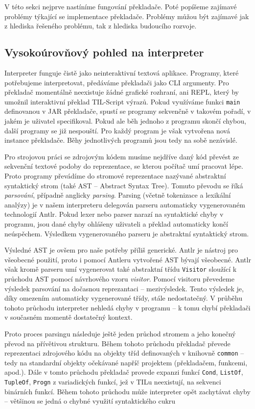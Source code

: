 V této sekci nejprve nastíníme fungování překladače. Poté popíšeme zajímavé problémy týkající se
implementace překladače. Problémy můžou být zajímavé jak z hlediska řešeného problému, tak
z hlediska budoucího rozvoje.

\subsection{Vysokoúrovňový pohled na interpreter}

Interpreter funguje čistě jako neinteraktivní textová aplikace. Programy, které potřebujeme
interpretovat, předáváme překladači jako CLI argumenty. Pro překladač momentálně neexistuje žádné
grafické rozhraní, ani REPL, který by umožnil interaktivní překlad TIL-Script výrazů. Pokud
využíváme funkci \lstinline{main} definovanou v JAR překladače, spustí se programy sekvenčně
v takovém pořadí, v jakém je uživatel specifikoval. Pokud ale běh jednoho z programu skončí chybou,
další programy se již nespouští. Pro každý program je však vytvořena nová instance překladače. Běhy
jednotlivých programů jsou tedy na sobě nezávislé.

Pro strojovou práci se zdrojovým kódem musíme nejdříve daný kód převést ze sekvenční textové podoby
do reprezentace, se kterou počítač umí pracovat lépe. Proto programy převádíme do stromové
reprezentace nazývané abstraktní syntaktický strom (také AST -- Abstract Syntax Tree). Tomuto převodu
se říká \textit{parsování}, případně anglicky \textit{parsing}. Parsing (včetně tokenizace a
lexikální analýzy) je v našem interpreteru delegován parseru automaticky vygenerovaném technologií
Antlr. Pokud lexer nebo parser narazí na syntaktické chyby v programu, jsou dané chyby ohlášeny
uživateli a překlad automaticky končí neúspěchem. Výsledkem vygenerovaného parseru je abstraktní
syntaktický strom.

Výsledné AST je ovšem pro naše potřeby příliš generické. Antlr je nástroj pro všeobecné použití,
proto i pomocí Antleru vytvořené AST bývají všeobecné. Antlr však kromě parseru umí vygenerovat také
abstraktní třídu \lstinline{Visitor} sloužící k průchodu AST pomocí návrhového vzoru
\textit{visitor}. Pomocí visitoru převedeme výsledek parsování na dočasnou reprezantaci --
mezivýsledek. Tento výsledek je, díky omezením automaticky vygenerované třídy, stále nedostatečný.
V průběhu tohoto průchodu interpreter nehledá chyby v programu -- k tomu chybí překladači v současném
momentě dostatečný kontext.

Proto proces parsingu následuje ještě jeden průchod stromem a jeho konečný převod na přívětivou
strukturu. Během tohoto průchodu překladač převede reprezentaci zdrojového kódu na objekty tříd
definovaných v knihovně \lstinline{common} -- tedy na standardní objekty očekávané napříč projektem
(překladačem, funkcemi, apod.). Dále v tomto průchodu překladač provede expanzi funkcí
\lstinline{Cond}, \lstinline{ListOf}, \lstinline{TupleOf}, \lstinline{Progn} z variadických funkcí,
jež v TILu neexistují, na sekvenci binárních funkcí. Během tohoto průchodu může interpreter opět
zachytávat chyby -- většinou se jedná o chybné využití syntaktického cukru

